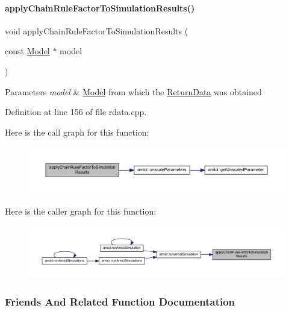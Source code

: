 \paragraph{\texorpdfstring{applyChainRuleFactorToSimulationResults()}{applyChainRuleFactorToSimulationResults()}}
{\footnotesize\ttfamily void apply\+Chain\+Rule\+Factor\+To\+Simulation\+Results (\begin{DoxyParamCaption}\item[{const \mbox{\hyperlink{classamici_1_1_model}{Model}} $\ast$}]{model }\end{DoxyParamCaption})}


\begin{DoxyParams}{Parameters}
{\em model} & \mbox{\hyperlink{classamici_1_1_model}{Model}} from which the \mbox{\hyperlink{classamici_1_1_return_data}{Return\+Data}} was obtained \\
\hline
\end{DoxyParams}


Definition at line 156 of file rdata.\+cpp.

Here is the call graph for this function\+:
\nopagebreak
\begin{figure}[H]
\begin{center}
\leavevmode
\includegraphics[width=350pt]{classamici_1_1_return_data_adce202dc864a1e65d8453f597de271f5_cgraph}
\end{center}
\end{figure}
Here is the caller graph for this function\+:
\nopagebreak
\begin{figure}[H]
\begin{center}
\leavevmode
\includegraphics[width=350pt]{classamici_1_1_return_data_adce202dc864a1e65d8453f597de271f5_icgraph}
\end{center}
\end{figure}


\subsubsection{Friends And Related Function Documentation}
\mbox{\label{classamici_1_1_return_data_af3646925990e46131d1bc92b5a7c0dc4}} 
